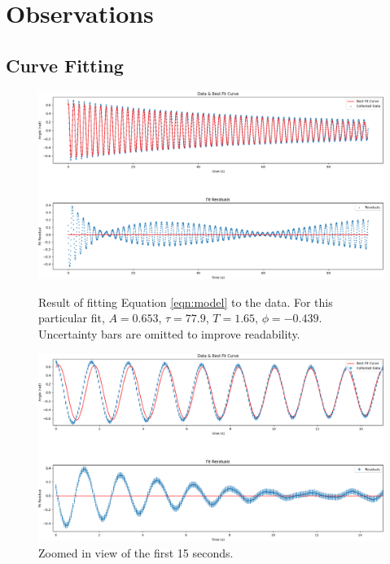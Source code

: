\documentclass[aps,twocolumn,secnumarabic,nobalancelastpage,amsmath,amssymb,nofootinbib,letterpaper]{revtex4}
\begin{document}

\section{Observations}

\subsection{Curve Fitting}

\begin{figure}[htb]
    \includegraphics[width=0.725\linewidth]{fit1.png}
    \caption{Result of fitting Equation \ref{eqn:model} to the data. For this particular fit, \(A = 0.653\),
    \(\tau = 77.9\), \(T = 1.65\), \(\phi = -0.439\). Uncertainty bars are omitted to improve readability.}
    \label{fig:fit}
    \includegraphics[width=0.725\linewidth]{fit2.png}
    \caption{Zoomed in view of the first 15 seconds.}
    \label{fig:fitzoom}
\end{figure}
\end{document}
